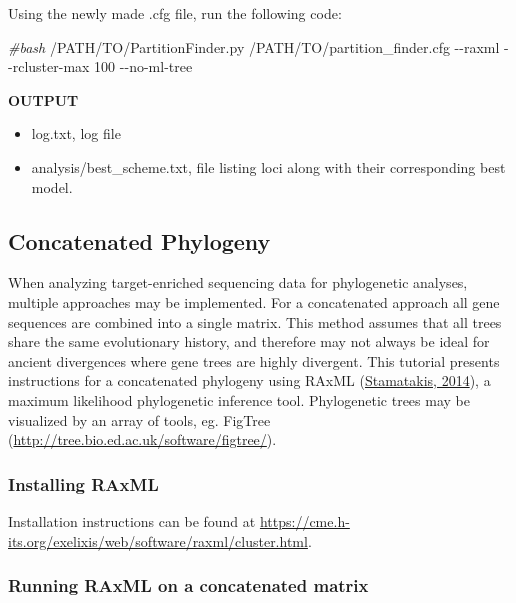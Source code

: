 \documentclass[
  12pt,
]{article}
\newenvironment{Shaded}{\begin{snugshade}}{\end{snugshade}}
\newcommand{\AttributeTok}[1]{\textcolor[rgb]{0.13,0.29,0.53}{#1}}
\newcommand{\CommentTok}[1]{\textcolor[rgb]{0.56,0.35,0.01}{\textit{#1}}}
\newcommand{\ExtensionTok}[1]{#1}
\newcommand{\NormalTok}[1]{#1}
\providecommand{\tightlist}{%
  \setlength{\itemsep}{0pt}\setlength{\parskip}{0pt}}
\begin{document}
Using the newly made .cfg file, run the following code:

\begin{Shaded}
\begin{Highlighting}[]
\CommentTok{\#bash}
\ExtensionTok{/PATH/TO/PartitionFinder.py}\NormalTok{ /PATH/TO/partition\_finder.cfg }\AttributeTok{{-}{-}raxml} \AttributeTok{{-}{-}rcluster{-}max}\NormalTok{ 100 }\AttributeTok{{-}{-}no{-}ml{-}tree}
\end{Highlighting}
\end{Shaded}

\textbf{OUTPUT}

\begin{itemize}
\tightlist
\item
  log.txt, log file
\item
  analysis/best\_scheme.txt, file listing loci along with their corresponding best model.
\end{itemize}

\hypertarget{concatenated-phylogeny}{%
\subsection{Concatenated Phylogeny}\label{concatenated-phylogeny}}

When analyzing target-enriched sequencing data for phylogenetic analyses, multiple approaches may be implemented. For a concatenated approach all gene sequences are combined into a single matrix. This method assumes that all trees share the same evolutionary history, and therefore may not always be ideal for ancient divergences where gene trees are highly divergent. This tutorial presents instructions for a concatenated phylogeny using RAxML (\protect\hyperlink{ref-Stamatakis2014}{Stamatakis, 2014}), a maximum likelihood phylogenetic inference tool. Phylogenetic trees may be visualized by an array of tools, eg. FigTree (\url{http://tree.bio.ed.ac.uk/software/figtree/}).

\hypertarget{installing-raxml}{%
\subsubsection{Installing RAxML}\label{installing-raxml}}

Installation instructions can be found at \url{https://cme.h-its.org/exelixis/web/software/raxml/cluster.html}.

\hypertarget{running-raxml-on-a-concatenated-matrix}{%
\subsubsection{Running RAxML on a concatenated matrix}\label{running-raxml-on-a-concatenated-matrix}}
\end{document}
